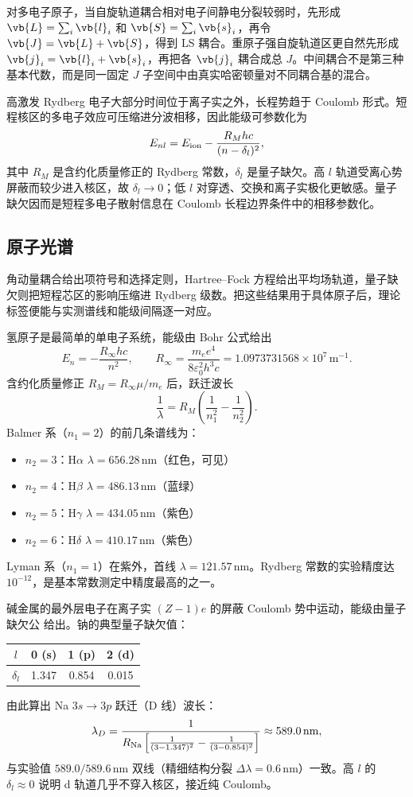 对多电子原子，当自旋轨道耦合相对电子间静电分裂较弱时，先形成 $\vb{L}=\sum_i\vb{l}_i$ 和 $\vb{S}=\sum_i\vb{s}_i$，再令 $\vb{J}=\vb{L}+\vb{S}$，得到 LS 耦合。重原子强自旋轨道区更自然先形成 $\vb{j}_i=\vb{l}_i+\vb{s}_i$，再把各 $\vb{j}_i$ 耦合成总 $J$。中间耦合不是第三种基本代数，而是同一固定 $J$ 子空间中由真实哈密顿量对不同耦合基的混合。

高激发 Rydberg 电子大部分时间位于离子实之外，长程势趋于 Coulomb 形式。短程核区的多电子效应可压缩进分波相移，因此能级可参数化为
\begin{equation}
E_{nl}
=E_{\rm ion}
-\frac{R_Mhc}{(n-\delta_l)^2},
\label{eq:am-quantum-defect}
\end{equation}
其中 $R_M$ 是含约化质量修正的 Rydberg 常数，$\delta_l$ 是量子缺欠。高 $l$ 轨道受离心势屏蔽而较少进入核区，故 $\delta_l\to0$；低 $l$ 对穿透、交换和离子实极化更敏感。量子缺欠因而是短程多电子散射信息在 Coulomb 长程边界条件中的相移参数化。

\subsection{原子光谱}
\label{sec:am-spectroscopy-experiment}

角动量耦合给出项符号和选择定则，Hartree--Fock 方程给出平均场轨道，量子缺欠则把短程芯区的影响压缩进 Rydberg 级数。把这些结果用于具体原子后，理论标签便能与实测谱线和能级间隔逐一对应。

氢原子是最简单的单电子系统，能级由 Bohr 公式给出
\[
 E_n=-\frac{R_\infty hc}{n^2},
 \qquad
 R_\infty=\frac{m_e e^4}{8\varepsilon_0^2 h^3 c}=1.0973731568\times10^7\,\mathrm{m}^{-1}.
\]
含约化质量修正 $R_M=R_\infty\mu/m_e$ 后，跃迁波长
\[
 \frac1\lambda=R_M\left(\frac1{n_1^2}-\frac1{n_2^2}\right).
\]
Balmer 系（$n_1=2$）的前几条谱线为：
\begin{itemize}
 \item $n_2=3$：H$\alpha$ $\lambda=656.28\,\mathrm{nm}$（红色，可见）
 \item $n_2=4$：H$\beta$ $\lambda=486.13\,\mathrm{nm}$（蓝绿）
 \item $n_2=5$：H$\gamma$ $\lambda=434.05\,\mathrm{nm}$（紫色）
 \item $n_2=6$：H$\delta$ $\lambda=410.17\,\mathrm{nm}$（紫色）
\end{itemize}
Lyman 系（$n_1=1$）在紫外，首线 $\lambda=121.57\,\mathrm{nm}$。Rydberg 常数的实验精度达 $10^{-12}$，是基本常数测定中精度最高的之一。

碱金属的最外层电子在离子实 $(Z-1)e$ 的屏蔽 Coulomb 势中运动，能级由量子缺欠公 给出。钠的典型量子缺欠值：
\begin{center}
\begin{tabular}{cccc}
\hline
$l$ & 0 (s) & 1 (p) & 2 (d) \\
\hline
$\delta_l$ & 1.347 & 0.854 & 0.015 \\
\hline
\end{tabular}
\end{center}
由此算出 Na $3s\to3p$ 跃迁（D 线）波长：
\[
 \lambda_D=\frac{1}{R_{\rm Na}\left[\frac1{(3-1.347)^2}-\frac1{(3-0.854)^2}\right]}\approx589.0\,\mathrm{nm},
\]
与实验值 $589.0/589.6\,\mathrm{nm}$ 双线（精细结构分裂 $\Delta\lambda=0.6\,\mathrm{nm}$）一致。高 $l$ 的 $\delta_l\approx0$ 说明 d 轨道几乎不穿入核区，接近纯 Coulomb。


